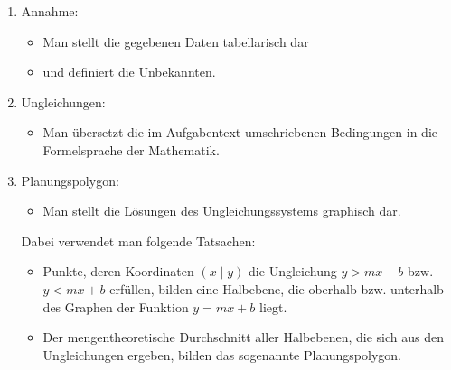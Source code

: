 \documentclass[%
11pt,%
twoside,%
titlepage,%
swissgerman,%
headsepline%
]{scrartcl}
\theoremstyle{definition}
\theoremstyle{plain}
\begin{document}
		\begin{enumerate}
			\item Annahme:
			\begin{itemize}
				\item Man stellt die gegebenen Daten tabellarisch dar
				\item und definiert die Unbekannten.
			\end{itemize}
			\item Ungleichungen:
			\begin{itemize}
				\item Man übersetzt die im Aufgabentext umschriebenen
				Bedingungen in die Formelsprache der Mathematik.
			\end{itemize}
			\item Planungspolygon:
			\begin{itemize}
				\item Man stellt die Lösungen des Ungleichungssystems graphisch
				dar.
			\end{itemize}
			Dabei verwendet man folgende Tatsachen:
			\begin{itemize}
				\item Punkte, deren Koordinaten $(x\mid y)$ die Ungleichung $y>mx+b$
				bzw. $y<mx+b$ erfüllen, bilden eine Halbebene, die oberhalb bzw.
				unterhalb des Graphen der Funktion $y=mx+b$ liegt.
				\item Der mengentheoretische Durchschnitt aller Halbebenen, die
				sich aus den Ungleichungen ergeben, bilden das sogenannte
				Planungspolygon.
			\end{itemize}
			

\end{enumerate}
\end{document}
